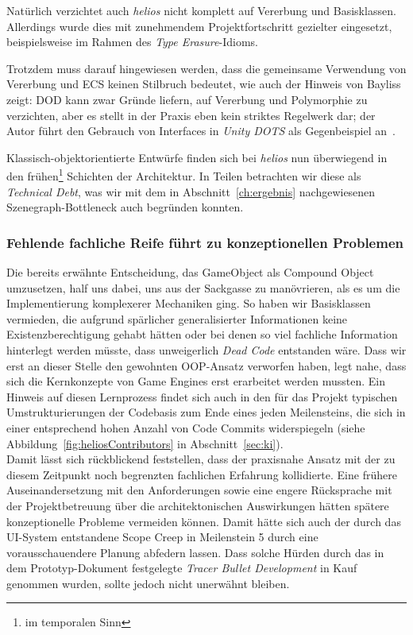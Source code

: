 Natürlich verzichtet auch \textit{helios} nicht komplett auf Vererbung und Basisklassen.
Allerdings wurde dies mit zunehmendem Projektfortschritt gezielter eingesetzt, beispielsweise im Rahmen des \textit{Type Erasure}-Idioms.

Trotzdem muss darauf hingewiesen werden, dass die gemeinsame Verwendung von Vererbung und ECS keinen Stilbruch bedeutet, wie auch der Hinweis von Bayliss zeigt: DOD kann zwar Gründe liefern, auf Vererbung und Polymorphie zu verzichten, aber es stellt in der Praxis eben kein striktes Regelwerk dar; der Autor führt den Gebrauch von Interfaces in \textit{Unity DOTS} als Gegenbeispiel an~\cite[S. 38]{Bay22}.

Klassisch-objektorientierte Entwürfe finden sich bei \textit{helios} nun überwiegend in den frühen\footnote{
    im temporalen Sinn
} Schichten der Architektur.
In Teilen betrachten wir diese als \textit{Technical Debt}, was wir mit dem in Abschnitt~\ref{ch:ergebnis} nachgewiesenen Szenegraph-Bottleneck auch begründen konnten.

\subsubsection{Fehlende fachliche Reife führt zu konzeptionellen Problemen}

Die bereits erwähnte Entscheidung, das GameObject als Compound Object umzusetzen, half uns dabei, uns aus der Sackgasse zu manövrieren, als es um die Implementierung komplexerer Mechaniken ging.
So haben wir Basisklassen vermieden, die aufgrund spärlicher generalisierter Informationen keine Existenzberechtigung gehabt hätten oder bei denen so viel fachliche Information hinterlegt werden müsste, dass unweigerlich \textit{Dead Code} entstanden wäre.
Dass wir erst an dieser Stelle den gewohnten OOP-Ansatz verworfen haben, legt nahe, dass sich die Kernkonzepte von Game Engines erst erarbeitet werden mussten.
Ein Hinweis auf diesen Lernprozess findet sich auch in den für das Projekt typischen Umstrukturierungen der Codebasis zum Ende eines jeden Meilensteins, die sich in einer entsprechend hohen Anzahl von Code Commits widerspiegeln (siehe Abbildung~\ref{fig:heliosContributors} in Abschnitt~\ref{sec:ki}).\\

Damit lässt sich rückblickend feststellen, dass der praxisnahe Ansatz mit der zu diesem Zeitpunkt noch begrenzten fachlichen Erfahrung kollidierte.
Eine frühere Auseinandersetzung mit den Anforderungen sowie eine engere Rücksprache mit der Projektbetreuung über die architektonischen Auswirkungen hätten spätere konzeptionelle Probleme vermeiden können.
Damit hätte sich auch der durch das UI-System entstandene Scope Creep in Meilenstein 5 durch eine vorausschauendere Planung abfedern lassen.
Dass solche Hürden durch das in dem Prototyp-Dokument festgelegte \textit{Tracer Bullet Development} in Kauf genommen wurden, sollte jedoch nicht unerwähnt bleiben.

